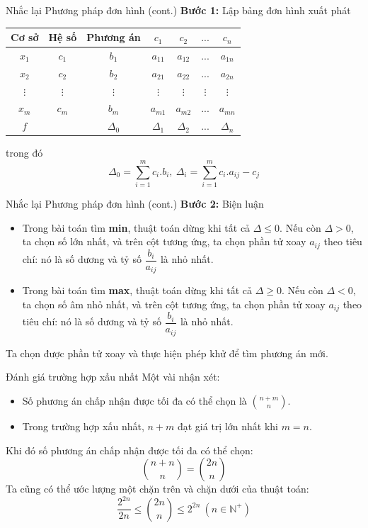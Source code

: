 \documentclass[10pt]{beamer}
\begin{document}
\begin{frame}{Nhắc lại Phương pháp đơn hình (cont.)}
\textbf{Bước 1:} Lập bảng đơn hình xuất phát
\begin{table}[H]
\centering
\begin{tabular}{|c|c|c|c|c|c|c|}
\hline
Cơ sở & Hệ số & Phương án & $c_1$ & $c_2$ & $...$ & $c_n$\\
\hline
$x_1$ & $c_1$ & $b_1$ & $a_{11}$ & $a_{12}$ & $...$ & $a_{1n}$ \\
$x_2$ & $c_2$ & $b_2$ & $a_{21}$ & $a_{22}$ & $...$ & $a_{2n}$ \\
$\vdots$ & $\vdots$ & $\vdots$ & $\vdots$ & $\vdots$ & $\vdots$ & $\vdots$\\
$x_m$ & $c_m$ & $b_m$ & $a_{m1}$ & $a_{m2}$ & $...$ & $a_{mn}$\\
\hline
$f$ & & $\Delta_0$ & $\Delta_1$ & $\Delta_2$ & $...$ & $\Delta_n$ \\
\hline
\end{tabular}
\end{table}
trong đó
$$
\Delta_0 = \sum^{m}_{i=1}c_{i}.b_i,\ \Delta_i = \sum^{m}_{i=1}c_i.a_{ij} - c_j
$$

\end{frame}

\begin{frame}{Nhắc lại Phương pháp đơn hình (cont.)}
\textbf{Bước 2:} Biện luận
\begin{itemize}
\item Trong bài toán tìm \textbf{min}, thuật toán dừng khi tất cả $\Delta \leq 0$. Nếu còn $\Delta > 0$, ta chọn số lớn nhất, và trên cột tương ứng, ta chọn phần tử xoay $a_{ij}$ theo tiêu chí: nó là số dương và tỷ số $\dfrac{b_{i}}{a_{ij}}$ là nhỏ nhất.
\item Trong bài toán tìm \textbf{max}, thuật toán dừng khi tất cả $\Delta \geq 0$. Nếu còn $\Delta < 0$, ta chọn số âm nhỏ nhất, và trên cột tương ứng, ta chọn phần tử xoay $a_{ij}$ theo tiêu chí: nó là số dương và tỷ số $\dfrac{b_{i}}{a_{ij}}$ là nhỏ nhất.
\end{itemize}
Ta chọn được phần tử xoay và thực hiện phép khử để tìm phương án mới.
\end{frame}

\begin{frame}{Đánh giá trường hợp xấu nhất}
Một vài nhận xét:
\begin{itemize}
\item Số phương án chấp nhận được tối đa có thể chọn là $\displaystyle \binom{n + m}{n}$.
\item Trong trường hợp xấu nhất, $n + m$ đạt giá trị lớn nhất khi $m = n$.
\end{itemize}
Khi đó số phương án chấp nhận được tối đa có thể chọn:
$$
\displaystyle \binom{n + n}{n} = \binom{2n}{n}
$$
Ta cũng có thể ước lượng một chặn trên và chặn dưới của thuật toán\cite{Vanderbei2020}:
$$
\frac{2^{2n}}{2n} \leq \binom{2n}{n} \leq 2^{2n} \ (n \in \mathbb{N^+})
$$
\end{frame}
\end{document}
